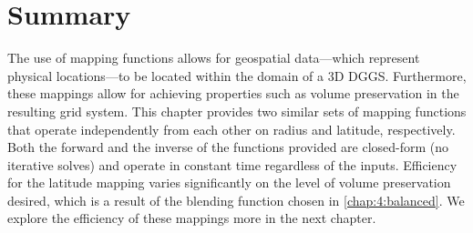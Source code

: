 \section{Summary}
The use of mapping functions allows for geospatial data---which represent physical locations---to be located within the domain of a 3D DGGS.
Furthermore, these mappings allow for achieving properties such as volume preservation in the resulting grid system.
This chapter provides two similar sets of mapping functions that operate independently from each other on radius and latitude, respectively.
Both the forward and the inverse of the functions provided are closed-form (no iterative solves) and operate in constant time regardless of the inputs.
Efficiency for the latitude mapping varies significantly on the level of volume preservation desired, which is a result of the blending function chosen in \cref{chap:4:balanced}.
We explore the efficiency of these mappings more in the next chapter.
